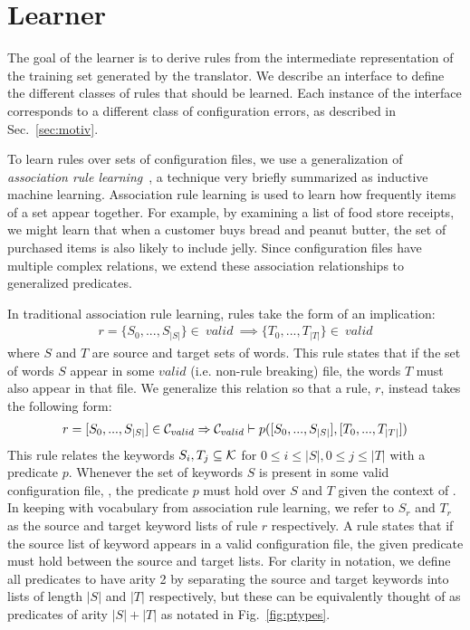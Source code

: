 \section{Learner}
\label{sec-learn}

The goal of the learner is to derive rules from the intermediate representation of the training set generated by the translator.
We describe an interface to define the different classes of rules that should be learned.
Each instance of the interface corresponds to a different class of configuration errors, as described in Sec.~\ref{sec:motiv}.

To learn rules over sets of configuration files, we use a generalization of \textit{association rule learning}~\cite{agrawal1993mining}, a technique very briefly summarized as inductive machine learning.
Association rule learning is used to learn how frequently items of a set appear together.
For example, by examining a list of food store receipts, we might learn that when a customer buys bread and peanut butter, the set of purchased items is also likely to include jelly.
Since configuration files have multiple complex relations, we extend these association relationships to generalized predicates.

In traditional association rule learning, rules take the form of an implication:
\begin{align*}
r = \{S_0,...,S_{|S|}\} \in\ valid\ \implies \{T_0,...,T_{|T|}\} \in\ valid
\end{align*}
where $S$ and $T$ are source and target sets of words.
This rule states that if the set of words $S$ appear in some $valid$ (i.e. non-rule breaking) file, the words $T$ must also appear in that file.
We generalize this relation so that a rule, $r$, instead takes the following form:
%
\begin{align*}
r = [S_0,...,S_{|S|}] \in \mathcal{C}_{valid} \Rightarrow \mathcal{C}_{valid} \vdash p([S_0,...,S_{|S|}],[T_0,...,T_{|T|}])
\end{align*}
%
This rule relates the keywords $S_i,T_j \subseteq \mathcal{K}$ for $0 \leq i \leq |S|, 0 \leq j \leq |T|$ with a predicate $p$.
Whenever the set of keywords $S$ is present in some valid configuration file, \validSet, the predicate $p$ must hold over $S$ and $T$ given the context of \validSet.
In keeping with vocabulary from association rule learning, we refer to $S_r$ and $T_r$ as the source and target keyword lists of rule $r$ respectively.
A rule states that if the source list of keyword appears in a valid configuration file, the given predicate must hold between the source and target lists.
For clarity in notation, we define all predicates to have arity 2 by separating the source and target keywords into lists of length $|S|$ and $|T|$ respectively,
   but these can be equivalently thought of as predicates of arity $|S|+|T|$ as notated in Fig.~\ref{fig:ptypes}.


